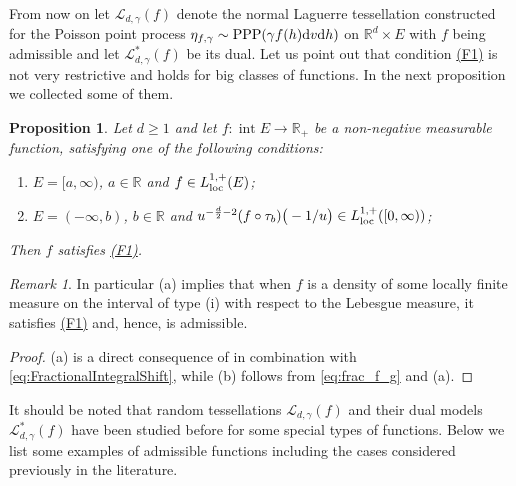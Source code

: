 \documentclass[11pt,a4paper]{article}
\theoremstyle{plain}
\newtheorem{proposition}[theorem]{Proposition}
\theoremstyle{definition}
\theoremstyle{remark}
\newtheorem{remark}[theorem]{Remark}
\def\RR{\mathbb{R}}
\def\cL{\mathcal{L}}
\newcommand{\dd}{{\rm d}}
\newcommand{\inter}{\operatorname{int}}
\newcommand{\PPP}{\operatorname{PPP}}
\begin{document}
From now on let $\cL_{d,\gamma}(f)$ denote the normal Laguerre tessellation constructed for the Poisson point process $\eta_{f,\gamma}\sim \PPP(\gamma f(h)\dd v\dd h)$ on $\RR^d \times E$ with $f$ being admissible and let $\cL^*_{d,\gamma}(f)$ be its dual. Let us point out that condition \hyperref[item:F1]{(F1)} is not very restrictive and holds for big classes of functions. In the next proposition we collected some of them.

\begin{proposition}\label{prop:FICondition2}
    Let $d\ge 1$ and let $f\colon \inter E \to \RR_+$ be a non-negative measurable function, satisfying one of the following conditions:
    \begin{enumerate}[label=(\alph*)]
        \item[(a)] $E=[a,\infty)$, $a\in\RR$ and $f\in L^{1,+}_{\rm loc}(E)$;
        \item[(b)] $E=(-\infty,b)$, $b\in\RR$ and $u^{-{d\over 2}-2}(f\circ \tau_b)\big(-1/u\big)\in L_{\rm loc}^{1,+}([0,\infty))$;
    \end{enumerate}
    Then $f$ satisfies \hyperref[item:F1]{(F1)}.
\end{proposition}

\begin{remark}
    In particular (a) implies that when $f$ is a density of some locally finite measure on the interval of type (i) with respect to the Lebesgue measure, it satisfies \hyperref[item:F1]{(F1)} and, hence, is admissible.
\end{remark}

\begin{proof}
    (a) is a direct consequence of \cite[Lemma 2.1]{MARTINEZ1992111} in combination with \eqref{eq:FractionalIntegralShift}, while (b) follows from \eqref{eq:frac_f_g} and (a).
\end{proof}


It should be noted that random tessellations $\cL_{d,\gamma}(f)$ and their dual models $\cL^*_{d,\gamma}(f)$ have been studied before for some special types of functions. Below we list some examples of admissible functions including the cases considered previously in the literature.
\end{document}
